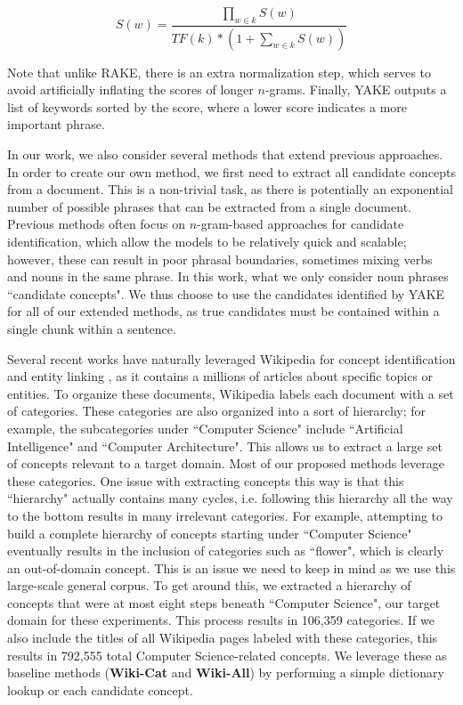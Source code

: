 \documentclass[thesis.tex]{subfiles}
\begin{document}
\begin{equation}
S(w) = \frac{\prod_{w \in k} S(w)}{TF(k) * (1 + \sum_{w \in k} S(w))}
\end{equation}

Note that unlike RAKE, there is an extra normalization step, which serves to avoid artificially inflating the scores of longer $n$-grams. Finally, YAKE outputs a list of keywords sorted by the score, where a lower score indicates a more important phrase.

In our work, we also consider several methods that extend previous approaches. In order to create our own method, we first need to extract all candidate concepts from a document. This is a non-trivial task, as there is potentially an exponential number of possible phrases that can be extracted from a single document. Previous methods often focus on $n$-gram-based  approaches for candidate identification, which allow the models to be relatively quick and scalable; however, these can result in poor phrasal boundaries, sometimes mixing verbs and nouns in the same phrase. In this work, what we only consider noun phrases ``candidate concepts". We thus choose to use the candidates identified by YAKE for all of our extended methods, as true candidates must be contained within a single chunk within a sentence.

Several recent works have naturally leveraged Wikipedia for concept identification and entity linking \citep{ratinov2011local,upadhyay2018joint}, as it contains a millions of articles about specific topics or entities. To organize these documents, Wikipedia labels each document with a set of categories. These categories are also organized into a sort of hierarchy; for example, the subcategories under ``Computer Science" include ``Artificial Intelligence" and ``Computer Architecture". This allows us to extract a large set of concepts relevant to a target domain. Most of our proposed methods leverage these categories. One issue with extracting concepts this way is that this ``hierarchy" actually contains many cycles, i.e. following this hierarchy all the way to the bottom results in many irrelevant categories. For example, attempting to build a complete hierarchy of concepts starting under ``Computer Science" eventually results in the inclusion of categories such as ``flower", which is clearly an out-of-domain concept. This is an issue we need to keep in mind as we use this large-scale general corpus. To get around this, we extracted a hierarchy of concepts that were at most eight steps beneath ``Computer Science", our target domain for these experiments. This process results in 106,359 categories. If we also include the titles of all Wikipedia pages labeled with these categories, this results in 792,555 total Computer Science-related concepts. We leverage these as baseline methods (\textbf{Wiki-Cat} and \textbf{Wiki-All}) by performing a simple dictionary lookup or each candidate concept.
\end{document}
